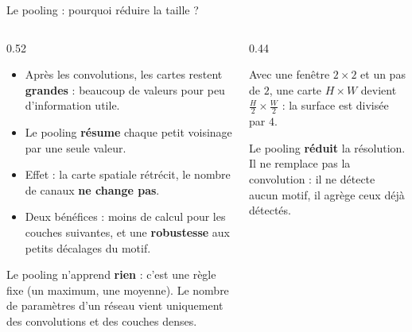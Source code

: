 \begin{frame}{Le pooling : pourquoi réduire la taille ?}
\begin{columns}[t]
\begin{column}{0.52\textwidth}
\begin{itemize}
  \item Après les convolutions, les cartes restent \textbf{grandes} :
  beaucoup de valeurs pour peu d'information utile.
  \item Le pooling \textbf{résume} chaque petit voisinage par une seule valeur.
  \item Effet : la carte spatiale rétrécit, le nombre de canaux \textbf{ne change pas}.
  \item Deux bénéfices : moins de calcul pour les couches suivantes, et une
  \textbf{robustesse} aux petits décalages du motif.
\end{itemize}
\begin{kbox}
Le pooling n'apprend \textbf{rien} : c'est une règle fixe (un maximum, une
moyenne). Le nombre de paramètres d'un réseau vient uniquement des convolutions
et des couches denses.
\end{kbox}
\end{column}
\begin{column}{0.44\textwidth}
\begin{ebox}[Dimensionnement]
Avec une fenêtre $2 \times 2$ et un pas de $2$, une carte
$H \times W$ devient $\tfrac{H}{2} \times \tfrac{W}{2}$ : la surface est
divisée par $4$.
\end{ebox}
\begin{wbox}
Le pooling \textbf{réduit} la résolution. Il ne remplace pas la convolution :
il ne détecte aucun motif, il agrège ceux déjà détectés.
\end{wbox}
\end{column}
\end{columns}
\end{frame}

